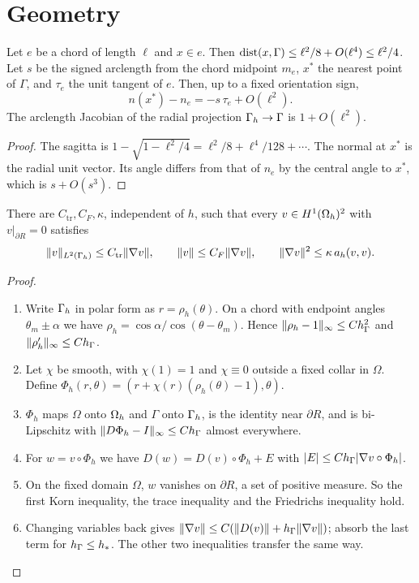 \section{Geometry}\label{sec:geometry}

\begin{lemma}[Chords]\label{lem:chords}
Let $e$ be a chord of length $\ell$ and $x\in e$. Then $\operatorname{dist}(x,\Gamma)\le\ell^2/8+O(\ell^4)\le\ell^2/4$.
Let $s$ be the signed arclength from the chord midpoint $m_e$, $x^\ast$ the nearest point of $\Gamma$, and $\tau_e$ the unit tangent of $e$. Then, up to a fixed orientation sign,
\[
n(x^\ast)-n_e=-s\,\tau_e+O(\ell^2).
\]
The arclength Jacobian of the radial projection $\Gamma_h\to\Gamma$ is $1+O(\ell^2)$.
\end{lemma}

\begin{proof}
The sagitta is $1-\sqrt{1-\ell^2/4}=\ell^2/8+\ell^4/128+\cdots$. The normal at $x^\ast$ is the radial unit vector. Its angle differs from that of $n_e$ by the central angle to $x^\ast$, which is $s+O(s^3)$.
\end{proof}

\begin{lemma}\label{lem:korn}
There are $C_{\mathrm{tr}},C_F,\kappa$, independent of $h$, such that every $v\in H^1(\Omega_h)^2$ with $v|_{\partial R}=0$ satisfies
\[
\lVert v\rVert_{L^2(\Gamma_h)}\le C_{\mathrm{tr}}\lVert \nabla v\rVert,\qquad
\lVert v\rVert\le C_F\lVert \nabla v\rVert,\qquad
\lVert \nabla v\rVert^2\le\kappa\,a_h(v,v).
\]
\end{lemma}

\begin{proof}
\begin{enumerate}
\item Write $\Gamma_h$ in polar form as $r=\rho_h(\theta)$. On a chord with endpoint angles $\theta_m\pm\alpha$ we have $\rho_h=\cos\alpha/\cos(\theta-\theta_m)$. Hence $\lVert \rho_h-1\rVert_\infty\le Ch_\Gamma^2$ and $\lVert \rho_h'\rVert_\infty\le Ch_\Gamma$.
\item Let $\chi$ be smooth, with $\chi(1)=1$ and $\chi\equiv0$ outside a fixed collar in $\Omega$. Define $\Phi_h(r,\theta)=(r+\chi(r)(\rho_h(\theta)-1),\theta)$.
\item $\Phi_h$ maps $\Omega$ onto $\Omega_h$ and $\Gamma$ onto $\Gamma_h$, is the identity near $\partial R$, and is bi-Lipschitz with $\lVert D\Phi_h-I\rVert_\infty\le Ch_\Gamma$ almost everywhere.
\item For $w=v\circ\Phi_h$ we have $D(w)=D(v)\circ\Phi_h+E$ with $|E|\le Ch_\Gamma|\nabla v\circ\Phi_h|$.
\item On the fixed domain $\Omega$, $w$ vanishes on $\partial R$, a set of positive measure. So the first Korn inequality, the trace inequality and the Friedrichs inequality hold.
\item Changing variables back gives $\lVert \nabla v\rVert\le C(\lVert D(v)\rVert+h_\Gamma\lVert \nabla v\rVert)$; absorb the last term for $h_\Gamma\le h_\ast$. The other two inequalities transfer the same way.\qedhere
\end{enumerate}
\end{proof}

